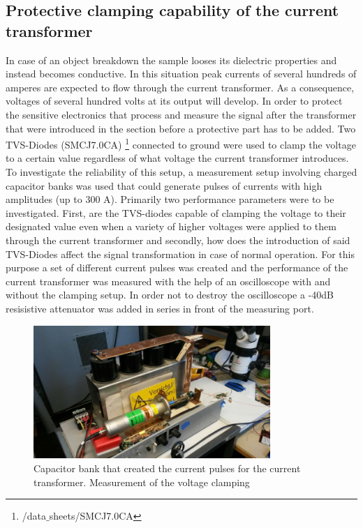 \subsection{Protective clamping capability of the current transformer}
\label{clamping}

In case of an object breakdown the sample looses its dielectric properties and instead becomes conductive.
In this situation peak currents of several hundreds of amperes are expected to flow through the current transformer.
As a consequence, voltages of several hundred volts at its output will develop. In order to protect the sensitive electronics that
process and measure the signal after the transformer that were introduced in the section before a protective part has to be added.
Two TVS-Diodes (SMCJ7.0CA) \footnote{/data$\_$sheets/SMCJ7.0CA} connected to ground were used to clamp the voltage to a certain value regardless of what voltage the current transformer introduces.
To investigate the reliability of this setup, a measurement setup involving charged capacitor banks was used that could generate
pulses of currents with high amplitudes (up to 300 A). 
Primarily two performance parameters were to be investigated. First, are the TVS-diodes capable of clamping the voltage to their designated value even when
a variety of higher voltages were applied to them through the current transformer and secondly, how does the introduction of said TVS-Diodes affect the
signal transformation in case of normal operation. 
\newline
For this purpose a set of different current pulses was created and the performance of the current transformer was measured with the help of an
oscilloscope with and without the clamping setup. In order not to destroy the oscilloscope a -40dB resisistive attenuator was added in series in front of
the measuring port.

\begin{figure}[H]
\centerline{\includegraphics[width=0.8\textwidth]{figures/Method/Clamp/capacitorbank.jpg}}
    \caption{Capacitor bank that created the current pulses for the current transformer. Measurement of the voltage clamping}
    \label{fig.clamp}
\end{figure}



